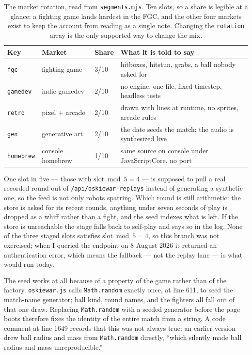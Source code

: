 \documentclass[10pt,letterpaper,twocolumn]{article}
\newcommand{\code}[1]{\texttt{#1}}
\begin{document}
\begin{table}[!t]
\centering
\caption{The market rotation, read from \code{segments.mjs}. Ten slots, so a
share is legible at a glance: a fighting game lands hardest in the FGC, and the
other four markets exist to keep the account from reading as a single note.
Changing the \code{rotation} array is the only supported way to change the mix.}
\label{tab:rotation}
\footnotesize
\begin{tabularx}{\columnwidth}{@{}P{0.13\columnwidth}P{0.16\columnwidth}P{0.07\columnwidth}L@{}}
\toprule
Key & Market & Share & What it is told to say \\
\midrule
\code{fgc} & fighting game & 3/10 & hitboxes, hitstun, grabs, a ball nobody asked for \\
\code{gamedev} & indie gamedev & 2/10 & no engine, one file, fixed timestep, headless tests \\
\code{retro} & pixel + arcade & 2/10 & drawn with lines at runtime, no sprites, arcade rules \\
\code{gen} & generative art & 2/10 & the date seeds the match; the audio is synthesized live \\
\code{homebrew} & console homebrew & 1/10 & same source on console under JavaScriptCore, no port \\
\bottomrule
\end{tabularx}
\end{table}

One slot in five --- those with $\text{slot} \bmod 5 = 4$ --- is supposed to
pull a real recorded round out of \code{/api/oskiewar-replays} instead of
generating a synthetic one, so the feed is not only robots sparring. Which round
is still arithmetic: the store is asked for its recent rounds, anything under
seven seconds of play is dropped as a whiff rather than a fight, and the seed
indexes what is left. If the store is unreachable the stage falls back to
self-play and says so in the log. None of the three staged slots satisfies
$\text{slot} \bmod 5 = 4$, so this branch was not exercised; when I queried the
endpoint on 8 August 2026 it returned an authentication error, which means the
fallback --- not the replay lane --- is what would run today.

The seed works at all because of a property of the game rather than of the
factory. \code{oskiewar.js} calls \code{Math.random} exactly once, at line 611, to
seed the match-name generator; ball kind, round names, and the fighters all fall
out of that one draw. Replacing \code{Math.random} with a seeded generator
before the page boots therefore fixes the identity of the entire match from a
string. A code comment at line 1649 records that this was not always true: an
earlier version drew ball radius and mass from \code{Math.random} directly,
``which silently made ball radius and mass unreproducible.''
\end{document}
